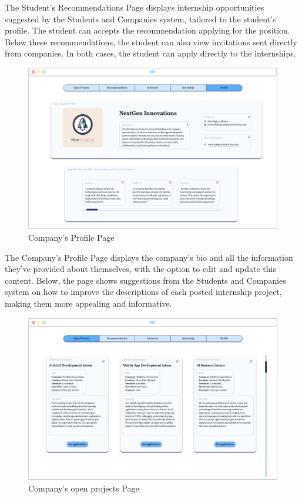 The Student's Recommendations Page displays internship opportunities suggested by the Students and Companies system, tailored to the student's profile. The student can accepts the recommendation applying for the position. Below these recommendations, the student can also view invitations sent directly from companies. In both cases, the student can apply directly to the internships.

\begin{figure}[H]
    \centering
    \includegraphics[width=1\linewidth]{DD//Images/UI photos/Company's Profile.png}
    \caption{Company's Profile Page}
\end{figure}

The Company's Profile Page displays the company's bio and all the information they’ve provided about themselves, with the option to edit and update this content. Below, the page shows suggestions from the Students and Companies system on how to improve the descriptions of each posted internship project, making them more appealing and informative.

\begin{figure}[H]
    \centering
    \includegraphics[width=1\linewidth]{DD//Images/UI photos/Company's Projects.png}
    \caption{Company's open projects Page}
\end{figure}

